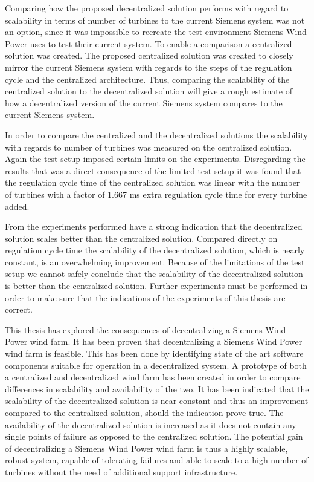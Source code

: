 Comparing how the proposed decentralized solution performs with regard to scalability in terms of number of turbines to the current Siemens system was not an option, since it was impossible to recreate the test environment Siemens Wind Power uses to test their current system. To enable a comparison a centralized solution was created. The proposed centralized solution was created to closely mirror the current Siemens system with regards to the steps of the regulation cycle and the centralized architecture. Thus, comparing the scalability of the centralized solution to the decentralized solution will give a rough estimate of how a decentralized version of the current Siemens system compares to the current Siemens system.

In order to compare the centralized and the decentralized solutions the scalability with regards to number of turbines was measured on the centralized solution. Again the test setup imposed certain limits on the experiments. Disregarding the results that was a direct consequence of the limited test setup it was found that the regulation cycle time of the centralized solution was linear with the number of turbines with a factor of 1.667 ms extra regulation cycle time for every turbine added.

From the experiments performed have a strong indication that the decentralized solution scales better than the centralized solution. Compared directly on regulation cycle time the scalability of the decentralized solution, which is nearly constant, is an overwhelming improvement. Because of the limitations of the test setup we cannot safely conclude that the scalability of the decentralized solution is better than the centralized solution. Further experiments must be performed in order to make sure that the indications of the experiments of this thesis are correct.

This thesis has explored the consequences of decentralizing a Siemens Wind Power wind farm. It has been proven that decentralizing a Siemens Wind Power wind farm is feasible. This has been done by identifying state of the art software components suitable for operation in a decentralized system. A prototype of both a centralized and decentralized wind farm has been created in order to compare differences in scalability and availability of the two. It has been indicated that the scalability of the decentralized solution is near constant and thus an improvement compared to the centralized solution, should the indication prove true. The availability of the decentralized solution is increased as it does not contain any single points of failure as opposed to the centralized solution. The potential gain of decentralizing a Siemens Wind Power wind farm is thus a highly scalable, robust system, capable of tolerating failures and able to scale to a high number of turbines without the need of additional support infrastructure.
